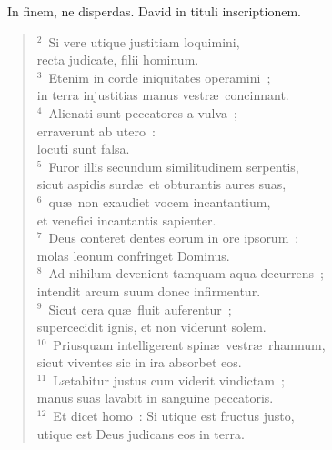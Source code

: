 ~\lettrine[lines=10,image=true,loversize=0.05,lraise=-0.03]{I}{}n finem, ne disperdas. David in tituli inscriptionem.
\begin{flushleft}\begin{verse}\vspace{6pt}${}^{2}$~Si vere utique justitiam loquimini,\\ recta judicate, filii hominum.\\
${}^{3}$~Etenim in corde iniquitates operamini~;\\ in terra injustitias manus vestr\ae\ concinnant.\\
${}^{4}$~Alienati sunt peccatores a vulva~;\\ erraverunt ab utero~:\\ locuti sunt falsa.\\
${}^{5}$~Furor illis secundum similitudinem serpentis,\\ sicut aspidis surd\ae\ et obturantis aures suas,\\
${}^{6}$~qu\ae\ non exaudiet vocem incantantium,\\ et venefici incantantis sapienter.\\
${}^{7}$~Deus conteret dentes eorum in ore ipsorum~;\\ molas leonum confringet Dominus.\\
${}^{8}$~Ad nihilum devenient tamquam aqua decurrens~;\\ intendit arcum suum donec infirmentur.\\
${}^{9}$~Sicut cera qu\ae\ fluit auferentur~;\\ supercecidit ignis, et non viderunt solem.\\
${}^{10}$~Priusquam intelligerent spin\ae\ vestr\ae\ rhamnum,\\ sicut viventes sic in ira absorbet eos.\\
${}^{11}$~L\ae tabitur justus cum viderit vindictam~;\\ manus suas lavabit in sanguine peccatoris.\\
${}^{12}$~Et dicet homo~: Si utique est fructus justo,\\ utique est Deus judicans eos in terra.\end{verse}\end{flushleft}


